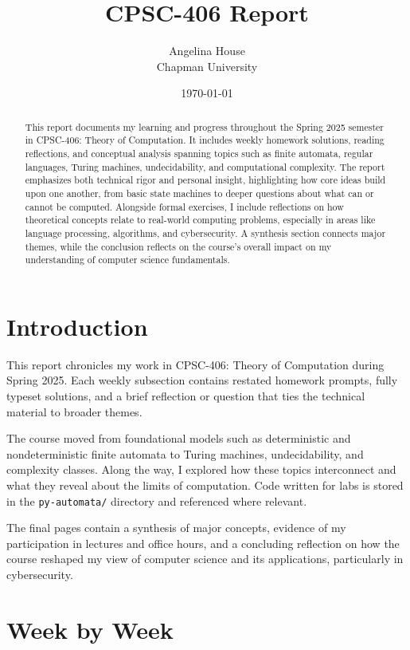 \documentclass{article}
\title{CPSC-406 Report}
\author{ Angelina House  \\ Chapman University}
\date{\today}
\theoremstyle{theorem}
\theoremstyle{definition}
\theoremstyle{remark}
\begin{document}
\maketitle

\begin{abstract}
This report documents my learning and progress throughout the Spring 2025 semester in CPSC-406: Theory of Computation. It includes weekly homework solutions, reading reflections, and conceptual analysis spanning topics such as finite automata, regular languages, Turing machines, undecidability, and computational complexity. The report emphasizes both technical rigor and personal insight, highlighting how core ideas build upon one another, from basic state machines to deeper questions about what can or cannot be computed. Alongside formal exercises, I include reflections on how theoretical concepts relate to real-world computing problems, especially in areas like language processing, algorithms, and cybersecurity. A synthesis section connects major themes, while the conclusion reflects on the course’s overall impact on my understanding of computer science fundamentals.
\end{abstract}

\setcounter{tocdepth}{3}
\tableofcontents


\section{Introduction}\label{intro}

This report chronicles my work in CPSC-406: Theory of Computation during Spring 2025. Each weekly subsection contains restated homework prompts, fully typeset solutions, and a brief reflection or question that ties the technical material to broader themes.

The course moved from foundational models such as deterministic and nondeterministic finite automata to Turing machines, undecidability, and complexity classes. Along the way, I explored how these topics interconnect and what they reveal about the limits of computation. Code written for labs is stored in the \texttt{py-automata/} directory and referenced where relevant.

The final pages contain a synthesis of major concepts, evidence of my participation in lectures and office hours, and a concluding reflection on how the course reshaped my view of computer science and its applications, particularly in cybersecurity.

\section{Week by Week}\label{homework}
\end{document}
